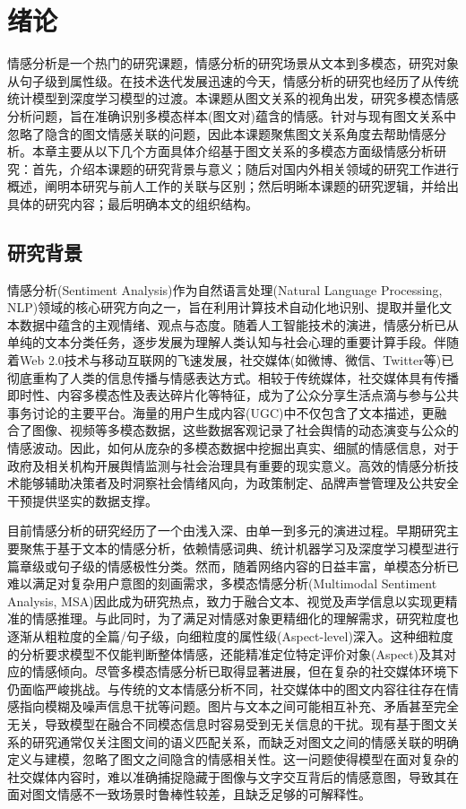 \chapter{绪论}

情感分析是一个热门的研究课题，情感分析的研究场景从文本到多模态，研究对象从句子级到属性级。在技术迭代发展迅速的今天，情感分析的研究也经历了从传统统计模型到深度学习模型的过渡。本课题从图文关系的视角出发，研究多模态情感分析问题，旨在准确识别多模态样本(图文对)蕴含的情感。针对与现有图文关系中忽略了隐含的图文情感关联的问题，因此本课题聚焦图文关系角度去帮助情感分析。本章主要从以下几个方面具体介绍基于图文关系的多模态方面级情感分析研究：首先，介绍本课题的研究背景与意义；随后对国内外相关领域的研究工作进行概述，阐明本研究与前人工作的关联与区别；然后明晰本课题的研究逻辑，并给出具体的研究内容；最后明确本文的组织结构。


\section{研究背景}
情感分析(Sentiment Analysis)作为自然语言处理(Natural Language Processing, NLP)领域的核心研究方向之一，旨在利用计算技术自动化地识别、提取并量化文本数据中蕴含的主观情绪、观点与态度。随着人工智能技术的演进，情感分析已从单纯的文本分类任务，逐步发展为理解人类认知与社会心理的重要计算手段。伴随着Web 2.0技术与移动互联网的飞速发展，社交媒体(如微博、微信、Twitter等)已彻底重构了人类的信息传播与情感表达方式。相较于传统媒体，社交媒体具有传播即时性、内容多模态性及表达碎片化等特征，成为了公众分享生活点滴与参与公共事务讨论的主要平台。海量的用户生成内容(UGC)中不仅包含了文本描述，更融合了图像、视频等多模态数据，这些数据客观记录了社会舆情的动态演变与公众的情感波动\cite{alamoodi2021sentiment,yue2019survey}。因此，如何从庞杂的多模态数据中挖掘出真实、细腻的情感信息，对于政府及相关机构开展舆情监测与社会治理具有重要的现实意义。高效的情感分析技术能够辅助决策者及时洞察社会情绪风向，为政策制定、品牌声誉管理及公共安全干预提供坚实的数据支撑。

目前情感分析的研究经历了一个由浅入深、由单一到多元的演进过程。早期研究主要聚焦于基于文本的情感分析，依赖情感词典、统计机器学习及深度学习模型进行篇章级或句子级的情感极性分类\cite{wankhade2022survey}。然而，随着网络内容的日益丰富，单模态分析已难以满足对复杂用户意图的刻画需求，多模态情感分析(Multimodal Sentiment Analysis, MSA)因此成为研究热点，致力于融合文本、视觉及声学信息以实现更精准的情感推理。与此同时，为了满足对情感对象更精细化的理解需求，研究粒度也逐渐从粗粒度的全篇/句子级，向细粒度的属性级(Aspect-level)深入。这种细粒度的分析要求模型不仅能判断整体情感，还能精准定位特定评价对象(Aspect)及其对应的情感倾向。尽管多模态情感分析已取得显著进展，但在复杂的社交媒体环境下仍面临严峻挑战。与传统的文本情感分析不同，社交媒体中的图文内容往往存在情感指向模糊及噪声信息干扰等问题。图片与文本之间可能相互补充、矛盾甚至完全无关，导致模型在融合不同模态信息时容易受到无关信息的干扰。现有基于图文关系的研究通常仅关注图文间的语义匹配关系，而缺乏对图文之间的情感关联的明确定义与建模，忽略了图文之间隐含的情感相关性。这一问题使得模型在面对复杂的社交媒体内容时，难以准确捕捉隐藏于图像与文字交互背后的情感意图，导致其在面对图文情感不一致场景时鲁棒性较差，且缺乏足够的可解释性。


